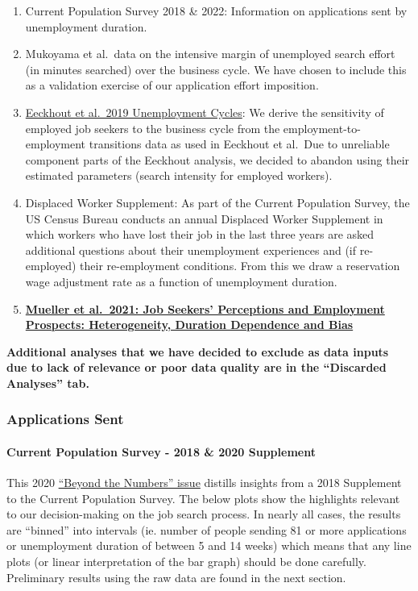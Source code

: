 \begin{enumerate}
\def\labelenumi{\arabic{enumi}.}
\item
  Current Population Survey 2018 \& 2022: Information on applications
  sent by unemployment duration.
\item
  Mukoyama et al.~data on the intensive margin of unemployed search
  effort (in minutes searched) over the business cycle. We have chosen
  to include this as a validation exercise of our application effort
  imposition.
\item
  \href{https://www.aeaweb.org/articles?id=10.1257/mac.20180105}{Eeckhout
  et al.~2019 Unemployment Cycles}: We derive the sensitivity of
  employed job seekers to the business cycle from the
  employment-to-employment transitions data as used in Eeckhout et
  al.~Due to unreliable component parts of the Eeckhout analysis, we
  decided to abandon using their estimated parameters (search intensity
  for employed workers).
\item
  Displaced Worker Supplement: As part of the Current Population Survey,
  the US Census Bureau conducts an annual Displaced Worker Supplement in
  which workers who have lost their job in the last three years are
  asked additional questions about their unemployment experiences and
  (if re-employed) their re-employment conditions. From this we draw a
  reservation wage adjustment rate as a function of unemployment
  duration.
\item
  \href{https://www.aeaweb.org/articles?id=10.1257/aer.20190808}{\textbf{Mueller
  et al.~2021: Job Seekers' Perceptions and Employment Prospects:
  Heterogeneity, Duration Dependence and Bias}}
\end{enumerate}

\textbf{Additional analyses that we have decided to exclude as data
inputs due to lack of relevance or poor data quality are in the
``Discarded Analyses'' tab.}

\subsubsection{Applications Sent}\label{applications-sent}

\paragraph{Current Population Survey - 2018 \& 2020
Supplement}\label{current-population-survey---2018-2020-supplement}

This 2020
\href{https://www.bls.gov/opub/btn/volume-9/how-do-jobseekers-search-for-jobs.htm\#_edn5}{``Beyond
the Numbers'' issue} distills insights from a 2018 Supplement to the
Current Population Survey. The below plots show the highlights relevant
to our decision-making on the job search process. In nearly all cases,
the results are ``binned'' into intervals (ie. number of people sending
81 or more applications or unemployment duration of between 5 and 14
weeks) which means that any line plots (or linear interpretation of the
bar graph) should be done carefully. Preliminary results using the raw
data are found in the next section.

